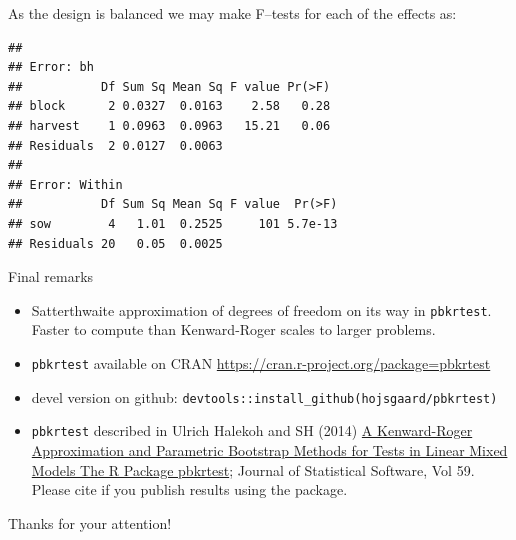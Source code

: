 \documentclass[
  ignorenonframetext,
]{beamer}
\newenvironment{Shaded}{\begin{snugshade}}{\end{snugshade}}
\newcommand{\DataTypeTok}[1]{\textcolor[rgb]{0.13,0.29,0.53}{#1}}
\newcommand{\KeywordTok}[1]{\textcolor[rgb]{0.13,0.29,0.53}{\textbf{#1}}}
\newcommand{\NormalTok}[1]{#1}
\newcommand{\OperatorTok}[1]{\textcolor[rgb]{0.81,0.36,0.00}{\textbf{#1}}}
\newcommand{\StringTok}[1]{\textcolor[rgb]{0.31,0.60,0.02}{#1}}
\providecommand{\tightlist}{%
  \setlength{\itemsep}{0pt}\setlength{\parskip}{0pt}}
\begin{document}
\begin{frame}[fragile]

As the design is balanced we may make F--tests for each of the effects
as:

\footnotesize

\begin{Shaded}
\end{Shaded}

\begin{verbatim}
## 
## Error: bh
##           Df Sum Sq Mean Sq F value Pr(>F)
## block      2 0.0327  0.0163    2.58   0.28
## harvest    1 0.0963  0.0963   15.21   0.06
## Residuals  2 0.0127  0.0063               
## 
## Error: Within
##           Df Sum Sq Mean Sq F value  Pr(>F)
## sow        4   1.01  0.2525     101 5.7e-13
## Residuals 20   0.05  0.0025
\end{verbatim}

\normalsize

\end{frame}

\begin{frame}[fragile]{Final remarks}
\protect\hypertarget{final-remarks}{}

\begin{itemize}
\item
  Satterthwaite approximation of degrees of freedom on its way in
  \texttt{pbkrtest}. Faster to compute than Kenward-Roger scales to
  larger problems.
\item
  \texttt{pbkrtest} available on CRAN
  \url{https://cran.r-project.org/package=pbkrtest}
\item
  devel version on github:
  \texttt{devtools::install\_github(hojsgaard/pbkrtest)}
\end{itemize}

\end{frame}

\begin{frame}[fragile]

\begin{itemize}
\tightlist
\item
  \texttt{pbkrtest} described in Ulrich Halekoh and SH (2014)
  \href{https://www.jstatsoft.org/article/view/v059i09}{A Kenward-Roger
  Approximation and Parametric Bootstrap Methods for Tests in Linear
  Mixed Models The R Package pbkrtest}; Journal of Statistical Software,
  Vol 59. Please cite if you publish results using the package.
\end{itemize}

Thanks for your attention!

\end{frame}
\end{document}
